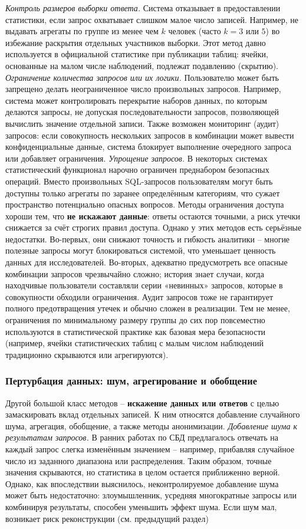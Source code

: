 \textit{Контроль размеров выборки ответа.} Система отказывает в предоставлении статистики, если запрос охватывает слишком малое число записей. Например, не выдавать агрегаты по группе из менее чем $k$ человек (часто $k=3$ или $5$) во избежание раскрытия отдельных участников выборки. Этот метод давно используется в официальной статистике при публикации таблиц: ячейки, основанные на малом числе наблюдений, подлежат подавлению (скрытию).
\textit{Ограничение количества запросов или их логики.} Пользователю может быть запрещено делать неограниченное число произвольных запросов. Например, система может контролировать перекрытие наборов данных, по которым делаются запросы, не допуская последовательности запросов, позволяющей вычислить значение отдельной записи. Также возможен мониторинг (аудит) запросов: если совокупность нескольких запросов в комбинации может вывести конфиденциальные данные, система блокирует выполнение очередного запроса или добавляет ограничения.
\textit{Упрощение запросов.} В некоторых системах статистический функционал нарочно ограничен преднабором безопасных операций. Вместо произвольных SQL-запросов пользователям могут быть доступны только агрегаты по заранее определённым категориям, что сужает пространство потенциально опасных вопросов.
Методы ограничения доступа хороши тем, что \textbf{не искажают данные}: ответы остаются точными, а риск утечки снижается за счёт строгих правил доступа. Однако у этих методов есть серьёзные недостатки. Во-первых, они снижают точность и гибкость аналитики – многие полезные запросы могут блокироваться системой, что уменьшает ценность данных для исследователей. Во-вторых, адекватно предусмотреть все опасные комбинации запросов чрезвычайно сложно; история знает случаи, когда находчивые пользователи составляли серии «невинных» запросов, которые в совокупности обходили ограничения. Аудит запросов тоже не гарантирует полного предотвращения утечек и обычно сложен в реализации. Тем не менее, ограничения по минимальному размеру группы до сих пор повсеместно используются в статистической практике как базовая мера безопасности (например, ячейки статистических таблиц с малым числом наблюдений традиционно скрываются или агрегируются). \subsubsection{Пертурбация данных: шум, агрегирование и обобщение}
Другой большой класс методов – \textbf{искажение данных или ответов} с целью замаскировать вклад отдельных записей. К ним относятся добавление случайного шума, агрегация, обобщение, а также методы анонимизации. \textit{Добавление шума к результатам запросов.} В ранних работах по СБД предлагалось отвечать на каждый запрос слегка изменённым значением – например, прибавляя случайное число из заданного диапазона или распределения. Таким образом, точные значения скрываются, но статистика в целом остается приближенно верной. Однако, как впоследствии выяснилось, неконтролируемое добавление шума может быть недостаточно: злоумышленник, усредняя многократные запросы или комбинируя результаты, способен уменьшить эффект шума. Если шум мал, возникает риск реконструкции (см. предыдущий раздел)
